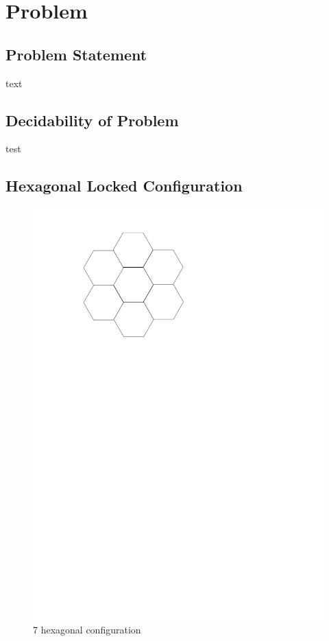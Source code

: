 \section{Problem}
\subsection{Problem Statement} text
\subsection{Decidability of Problem} test
\subsection{Hexagonal Locked Configuration}
\begin{figure}[ht]
\begin{center}
\includegraphics[scale=.33]{graphics/7hexLocked.pdf}
\caption{7 hexagonal configuration}
\label{figure:7hexLocked}
\end{center} 
\end{figure}
\newpage